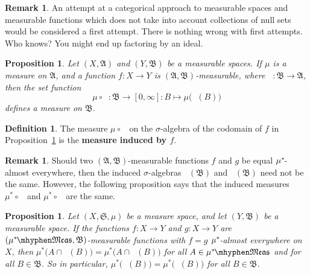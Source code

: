 \documentclass[
twoside=true,
paper=letter,
fontsize=9pt,
pagesize=auto,
leqno,
openany,
headsepline,
overfullrule,
]{scrbook}
\theoremstyle{plain}
\theoremstyle{plain}
\newtheorem{prop}[thm]{Proposition}
\theoremstyle{definition}
\newtheorem{defn}[thm]{Definition}
\newtheorem{rmk}[thm]{Remark}
\theoremstyle{bfnoteitalic}
\theoremstyle{bfnoteroman}
\newcommand{\sigalg}[1]{\mathfrak{#1}}
\newcommand{\textsigma}{\hbox{\large{$\sigma$}}\kern-1pt}
\newcommand{\preimage}[1]{\mathop{#1^{\leftarrow}}}
\newcommand{\meets}{\cap}
\newcommand{\semiring}{\sigalg{S}}
\newcommand{\sigmaalgebra}{\sigalg{A}}
\newcommand{\sigmaalgebraii}{\sigalg{B}}
\newcommand{\measurable}[1]{{#1}\mhyphen\mathfrak{Meas}}
\newcommand{\kernast}{\ast\kern-1pt}
\newcommand{\function}{f}
\newcommand{\measurespace}{X}
\newcommand{\measurespaceii}{Y}
\newcommand{\measure}{\mu}
\begin{document}
\begin{rmk}
An attempt at a categorical approach to measurable spaces and measurable functions which does not take into account collections of null sets would be considered a first attempt.  There is nothing wrong with first attempts. Who knows? You might end up factoring by an ideal.
\end{rmk}





\begin{prop}\label{function_induces_measure}
Let $(\measurespace,\sigmaalgebra)$  and  $(\measurespaceii, \sigmaalgebraii)$ be a measurable spaces.  
If $\measure$ is a measure on $\sigmaalgebra$, and a function $f:\measurespace\to\measurespaceii$ is 
$(\sigmaalgebra, \sigmaalgebraii)$\hyp{}measurable, where $\preimage{f}:\sigmaalgebraii\to\sigmaalgebra$,
then the set function
\[
\measure\circ\preimage{f} 
: \sigmaalgebraii\to [0,\infty] 
: B\mapsto \measure\bigl(\preimage{f}(B)\bigr)
\]
defines a measure on $\sigmaalgebraii$.
\end{prop}


\begin{defn}\label{induced_measure}
The measure $\measure\circ\preimage{\function}$ on the \textsigma-algebra of the codomain of $\function$ in Proposition~\ref{function_induces_measure} is the \textbf{measure induced by $\function$}.
\end{defn}



\begin{rmk} 
Should two $(\sigmaalgebra, \sigmaalgebraii)$\hyp{}measurable functions $f$ and $g$ be equal $\measure^\kernast$-almost everywhere, then the induced \textsigma-algebras $\preimage{f}(\sigmaalgebraii)$ and $\preimage{g}(\sigmaalgebraii)$  need not be the same. However, the following proposition says that the induced measures 
$\measure^*\circ \preimage{f}$ and $\measure^*\circ\preimage{g}$ are the same. 
\end{rmk}


\begin{prop}\label{class_induces_measure}
Let $(\measurespace,\semiring,\measure)$ be a measure space, and let $(\measurespaceii, \sigmaalgebraii)$ be a measurable space.  If  the functions 
$f:\measurespace\to\measurespaceii$ 
and
$g:\measurespace\to\measurespaceii$ 
are $(\measurable{\measure^\kernast}, \sigmaalgebraii)$\hyp{}measurable functions with 
$f = g$ $\measure^\kernast$-almost everywhere on $\measurespace$, then 
$\measure^*\bigl(A\meets \preimage{f}(B)\bigr) 
= 
\measure^*\bigl(A\meets \preimage{g}(B)\bigr)$ for all
$A\in \measurable{\measure^\kernast}$ and for all $B\in\sigmaalgebraii$.
So in particular,
$\measure^*\bigl(\preimage{f}(B)\bigr) 
= 
\measure^*\bigl(\preimage{g}(B)\bigr)$ for all
$B\in\sigmaalgebraii$.
\end{prop}
\end{document}
